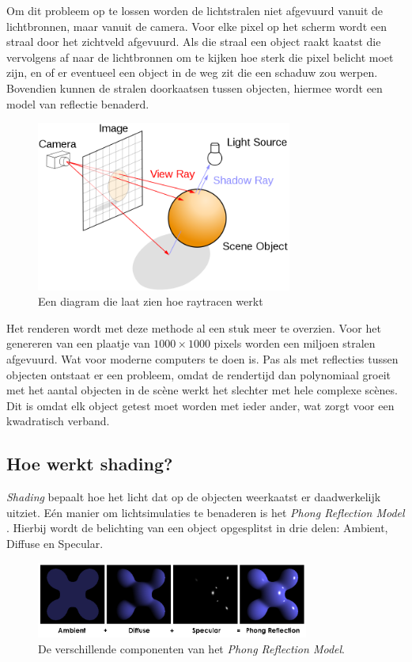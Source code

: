 \documentclass[12pt, a4paper]{article}
\begin{document}
Om dit probleem op te lossen worden de lichtstralen niet afgevuurd vanuit de lichtbronnen, maar vanuit de camera. Voor elke pixel op het scherm wordt een straal door het zichtveld afgevuurd. Als die straal een object raakt kaatst die vervolgens af naar de lichtbronnen om te kijken hoe sterk die pixel belicht moet zijn, en of er eventueel een object in de weg zit die een schaduw zou werpen. Bovendien kunnen de stralen doorkaatsen tussen objecten, hiermee wordt een model van reflectie benaderd. 

\begin{figure}[H]
    \centering
    \includegraphics[width=0.75\textwidth]{raytracing_diagram.png}
    \caption{Een diagram die laat zien hoe raytracen werkt}
    \label{fig:raytracing_diagram}
\end{figure}

Het renderen wordt met deze methode al een stuk meer te overzien. Voor het genereren van een plaatje van \(1000\times 1000\) pixels worden een miljoen stralen afgevuurd. Wat voor moderne computers te doen is. Pas als met reflecties tussen objecten ontstaat er een probleem, omdat de rendertijd dan polynomiaal groeit met het aantal objecten in de scène werkt het slechter met hele complexe scènes. Dit is omdat elk object getest moet worden met ieder ander, wat zorgt voor een kwadratisch verband.

\subsection{Hoe werkt shading?}
\textit{Shading} bepaalt hoe het licht dat op de objecten weerkaatst er daadwerkelijk uitziet. 
Eén manier om lichtsimulaties te benaderen is het \emph{Phong Reflection Model} \cite{PhongReflectionModel}. Hierbij wordt de belichting van een object opgesplitst in drie delen: Ambient, Diffuse en Specular.
\begin{figure}[H]
\centering
\includegraphics[width=0.8\textwidth]{Phong_components.png}
\caption{De verschillende componenten van het \emph{Phong Reflection Model}.}
\label{fig:phong_components}
\end{figure}
\end{document}
